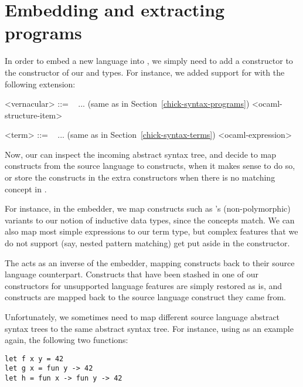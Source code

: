 \section{Embedding and extracting programs}\label{coop-embedding-extracting}

In order to embed a new language into \Chick{}, we simply need to add a
constructor to the constructor of our  and
 types.  For instance, we added support for \OCaml{} with the
following extension:

\begin{grammar}
<vernacular> ::= \ %
\alt ... \hfill (same as in Section~\ref{chick-syntax-programs})
\alt {} <ocaml-structure-item>

<term> ::= \ %
\alt ... \hfill (same as in Section~\ref{chick-syntax-terms})
\alt {} <ocaml-expression>
\end{grammar}

Now, our  can inspect the incoming abstract syntax tree, and
decide to map constructs from the source language to \Chick{} constructs, when
it makes sense to do so, or store the constructs in the extra constructors when
there is no matching concept in \Chick{}.

For instance, in the \OCaml{} embedder, we map constructs such as \OCaml{}'s
(non-polymorphic) variants to our notion of inductive data types, since the
concepts match.  We can also map most simple expressions to our term type, but
complex features that we do not support (say, nested pattern matching) get put
aside in the  constructor.

The  acts as an inverse of the embedder, mapping \Chick{}
constructs back to their source language counterpart.  Constructs that have
been stashed in one of our constructors for unsupported language features
are simply restored as is, and \Chick{} constructs are mapped back to the
source language construct they came from.

Unfortunately, we sometimes need to map different source language abstract
syntax trees to the same \Chick{} abstract syntax tree.  For instance,
using \OCaml{} as an example again, the following two functions:

\begin{verbatim}
let f x y = 42
let g x = fun y -> 42
let h = fun x -> fun y -> 42
\end{verbatim}

